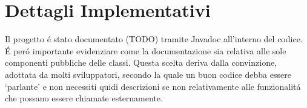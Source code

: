 \section{Dettagli Implementativi}


Il progetto \'e stato documentato (TODO) tramite Javadoc all'interno del codice. \'E per\'o importante evidenziare come la documentazione sia relativa alle sole componenti pubbliche delle classi. Questa scelta deriva dalla convinzione, adottata da molti sviluppatori, secondo la quale un buon codice debba essere `parlante' e non necessiti quidi descrizioni se non relativamente alle funzionalit\'a che possano essere chiamate esternamente.

